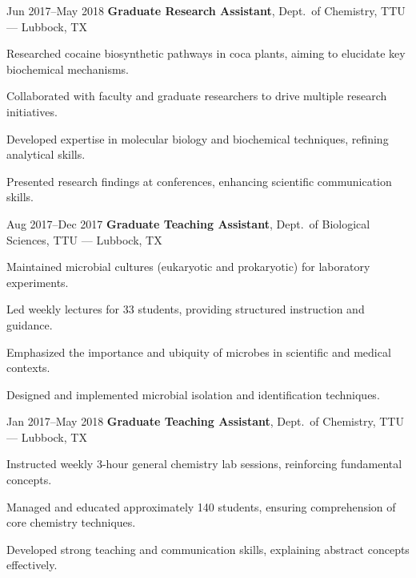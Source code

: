 \documentclass{resume}
\begin{document}
        \begin{twocolentry}{Jun 2017--May 2018}
            \textbf{Graduate Research Assistant}, Dept.\ of Chemistry, TTU --- Lubbock, TX
        \end{twocolentry}
        \begin{onecolentry}
            \begin{highlights}
                \item Researched cocaine biosynthetic pathways in coca plants, aiming to elucidate key biochemical mechanisms.
                \item Collaborated with faculty and graduate researchers to drive multiple research initiatives.
                \item Developed expertise in molecular biology and biochemical techniques, refining analytical skills.
                \item Presented research findings at conferences, enhancing scientific communication skills.
            \end{highlights}
        \end{onecolentry}

        \begin{twocolentry}{Aug 2017--Dec 2017}
            \textbf{Graduate Teaching Assistant}, Dept.\ of Biological Sciences, TTU --- Lubbock, TX
        \end{twocolentry}
        \begin{onecolentry}
            \begin{highlights}
                \item Maintained microbial cultures (eukaryotic and prokaryotic) for laboratory experiments.
                \item Led weekly lectures for 33 students, providing structured instruction and guidance.
                \item Emphasized the importance and ubiquity of microbes in scientific and medical contexts.
                \item Designed and implemented microbial isolation and identification techniques.
            \end{highlights}
        \end{onecolentry}

        \begin{twocolentry}{Jan 2017--May 2018}
            \textbf{Graduate Teaching Assistant}, Dept.\ of Chemistry, TTU --- Lubbock, TX
        \end{twocolentry}
        \begin{onecolentry}
            \begin{highlights}
                \item Instructed weekly 3-hour general chemistry lab sessions, reinforcing fundamental concepts.
                \item Managed and educated approximately 140 students, ensuring comprehension of core chemistry techniques.
                \item Developed strong teaching and communication skills, explaining abstract concepts effectively.
            \end{highlights}
        \end{onecolentry}
\end{document}
